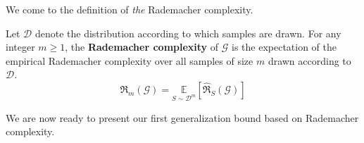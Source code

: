 We come to the definition of \textit{the} Rademacher complexity. 
\begin{definition}
    Let $\mathcal{D}$ denote the distribution according to which samples are drawn. For any integer $m\geq 1$, the \textbf{Rademacher complexity} of $\mathcal{G}$ is the expectation of the empirical Rademacher complexity over all samples of size $m$ drawn according to $\mathcal{D}$. 
    \begin{equation}
        \mathfrak{R}_{m} (\mathcal{G}) = \underset{S\sim \mathcal{D}^{m}}{\mathbb{E}} [\hat{\mathfrak{R}}_{S}(\mathcal{G})]
    \end{equation}
\end{definition}

We are now ready to present our first generalization bound based on Rademacher complexity. 

